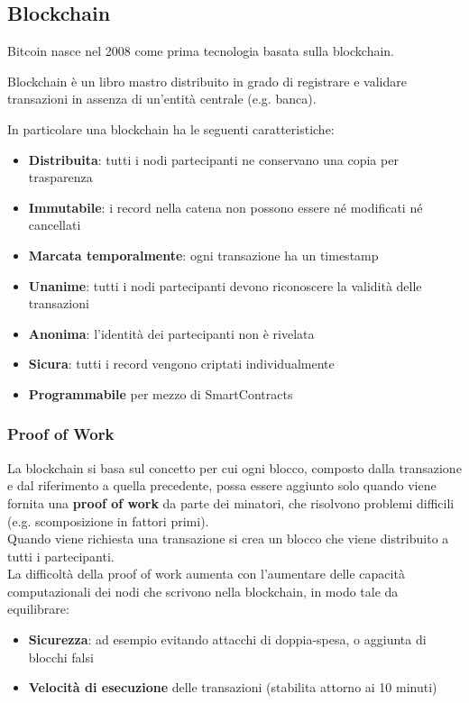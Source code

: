 \subsection{Blockchain}
Bitcoin nasce nel 2008 come prima tecnologia basata sulla blockchain.
\begin{definition}[Blockchain]
	Blockchain è un libro mastro distribuito in grado di registrare e validare transazioni in assenza di un’entità centrale (e.g. banca).
\end{definition}
In particolare una blockchain ha le seguenti caratteristiche:
\begin{itemize}
	\item \textbf{Distribuita}: tutti i nodi partecipanti ne conservano una copia per trasparenza
	\item \textbf{Immutabile}: i record nella catena non possono essere né modificati né cancellati
	\item \textbf{Marcata temporalmente}: ogni transazione ha un timestamp
	\item \textbf{Unanime}: tutti i nodi partecipanti devono riconoscere la validità delle transazioni
	\item \textbf{Anonima}: l’identità dei partecipanti non è rivelata
	\item \textbf{Sicura}: tutti i record vengono criptati individualmente
	\item \textbf{Programmabile} per mezzo di SmartContracts
\end{itemize}

\subsubsection{Proof of Work}
La blockchain si basa sul concetto per cui ogni blocco, composto dalla transazione e dal riferimento a quella precedente, possa essere aggiunto solo quando viene fornita una \textbf{proof of work} da parte dei minatori, che risolvono problemi difficili (e.g. scomposizione in fattori primi).\\
Quando viene richiesta una transazione si crea un blocco che viene distribuito a tutti i partecipanti.\\
La difficoltà della proof of work aumenta con l'aumentare delle capacità computazionali dei nodi che scrivono nella blockchain, in modo tale da equilibrare:
\begin{itemize}
	\item \textbf{Sicurezza}: ad esempio evitando attacchi di doppia-spesa, o aggiunta di blocchi falsi 
	\item \textbf{Velocità di esecuzione} delle transazioni (stabilita attorno ai 10 minuti)
\end{itemize}

